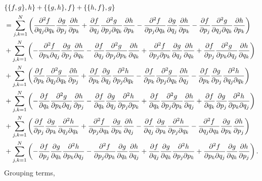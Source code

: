 \documentclass{article}
\begin{document}
\begin{align*}
&\{\{f,g\},h\}+\{\{g,h\},f\}+\{\{h,f\},g\}\\&=
\sum_{j,k=1}^{N}\left(\ppm{f}{q_j}{q_k}\pp{g}{p_j}\pp{h}{p_k}+\pp{f}{q_j}\ppm{g}{p_j}{q_k}\pp{h}{p_k}-
\ppm{f}{p_j}{q_k}\pp{g}{q_j}\pp{h}{p_k}-\pp{f}{p_j}\ppm{g}{q_j}{q_k}\pp{h}{p_k}\right)\\&+
\sum_{j,k=1}^{N}\left(-\ppm{f}{p_k}{q_j}\pp{g}{p_j}\pp{h}{q_k}-\pp{f}{q_j}\ppm{g}{p_j}{p_k}\pp{h}{q_k}+
\ppm{f}{p_j}{p_k}\pp{g}{q_j}\pp{h}{q_k}+\pp{f}{p_j}\ppm{g}{p_k}{q_j}\pp{h}{q_k}\right)\\&+
\sum_{j,k=1}^{N}\left(\pp{f}{p_k}\ppm{g}{q_j}{q_k}\pp{h}{p_j}+\pp{f}{p_k}\pp{g}{q_j}\ppm{h}{p_j}{q_k}-
\pp{f}{p_k}\ppm{g}{p_j}{q_k}\pp{h}{q_j}-\pp{f}{p_k}\pp{g}{p_j}\ppm{h}{q_j}{q_k}\right)\\&+
\sum_{j,k=1}^{N}\left(-\pp{f}{q_k}\ppm{g}{p_k}{q_j}\pp{h}{p_j}-\pp{f}{q_k}\pp{g}{q_j}\ppm{h}{p_j}{p_k}+
\pp{f}{q_k}\ppm{g}{p_j}{p_k}\pp{h}{q_j}+\pp{f}{q_k}\pp{g}{p_j}\ppm{h}{p_k}{q_j}\right)\\&+
\sum_{j,k=1}^{N}\left(\pp{f}{p_j}\pp{g}{p_k}\ppm{h}{q_j}{q_k}+\ppm{f}{p_j}{q_k}\pp{g}{p_k}\pp{h}{q_j}-
\pp{f}{q_j}\pp{g}{p_k}\ppm{h}{p_j}{q_k}-\ppm{f}{q_j}{q_k}\pp{g}{p_k}\pp{h}{p_j}\right)\\&+
\sum_{j,k=1}^{N}\left(-\pp{f}{p_j}\pp{g}{q_k}\ppm{h}{p_k}{q_j}-\ppm{f}{p_j}{p_k}\pp{g}{q_k}\pp{h}{q_j}+
\pp{f}{q_j}\pp{g}{q_k}\ppm{h}{p_j}{p_k}+\ppm{f}{p_k}{q_j}\pp{g}{q_k}\pp{h}{p_j}\right).
\end{align*}
Grouping terms,
\end{document}
